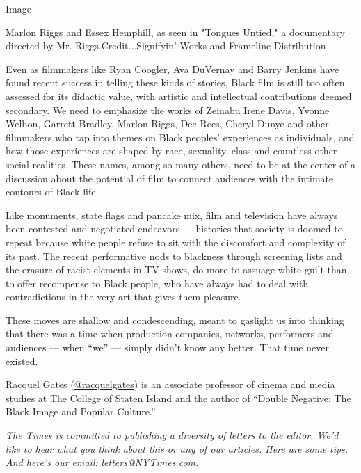 Image

Marlon Riggs and Essex Hemphill, as seen in "Tongues Untied," a
documentary directed by Mr. Riggs.Credit...Signifyin' Works and
Frameline Distribution

Even as filmmakers like Ryan Coogler, Ava DuVernay and Barry Jenkins
have found recent success in telling these kinds of stories, Black film
is still too often assessed for its didactic value, with artistic and
intellectual contributions deemed secondary. We need to emphasize the
works of Zeinabu Irene Davis, Yvonne Welbon, Garrett Bradley, Marlon
Riggs, Dee Rees, Cheryl Dunye and other filmmakers who tap into themes
on Black peoples' experiences as individuals, and how those experiences
are shaped by race, sexuality, class and countless other social
realities. These names, among so many others, need to be at the center
of a discussion about the potential of film to connect audiences with
the intimate contours of Black life.

Like monuments, state flags and pancake mix, film and television have
always been contested and negotiated endeavors --- histories that
society is doomed to repeat because white people refuse to sit with the
discomfort and complexity of its past. The recent performative nods to
blackness through screening lists and the erasure of racist elements in
TV shows, do more to assuage white guilt than to offer recompense to
Black people, who have always had to deal with contradictions in the
very art that gives them pleasure.

These moves are shallow and condescending, meant to gaslight us into
thinking that there was a time when production companies, networks,
performers and audiences --- when ``we'' --- simply didn't know any
better. That time never existed.

Racquel Gates (\href{https://twitter.com/racquelgates}{@racquelgates})
is an associate professor of cinema and media studies at The College of
Staten Island and the author of ``Double Negative: The Black Image and
Popular Culture.''

\emph{The Times is committed to publishing}
\href{https://www.nytimes3xbfgragh.onion/2019/01/31/opinion/letters/letters-to-editor-new-york-times-women.html}{\emph{a
diversity of letters}} \emph{to the editor. We'd like to hear what you
think about this or any of our articles. Here are some}
\href{https://help.nytimes3xbfgragh.onion/hc/en-us/articles/115014925288-How-to-submit-a-letter-to-the-editor}{\emph{tips}}\emph{.
And here's our email:}
\href{mailto:letters@NYTimes.com}{\emph{letters@NYTimes.com}}\emph{.}

